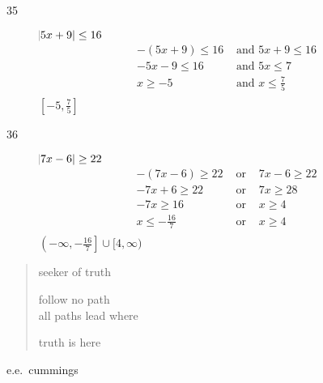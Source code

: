 \documentclass[letterpaper, landscape]{exam}
\begin{document}
\begin{description}
      \item[35]
        $ \abs{ 5x + 9 } \leq 16 $
        \begin{align*}
          -(5x + 9) \leq 16 & \text{ and } 5x + 9 \leq 16 \\
          -5x - 9 \leq 16   & \text{ and } 5x \leq 7 \\
          x \geq -5         & \text{ and } x \leq \frac{7}{5} \\
        \end{align*}
        $\boxed{ \left[ -5, \frac{7}{5} \right] }$

      \item[36]
        $\abs{ 7x - 6 } \geq 22$
        \begin{align*}
          -(7x - 6) \geq 22     & \text{ or } & 7x - 6 \geq 22 \\
          -7x + 6 \geq 22       & \text{ or } & 7x \geq 28 \\
          -7x \geq 16           & \text{ or } & x \geq 4 \\
          x \leq - \frac{16}{7} & \text{ or } & x \geq 4 \\
        \end{align*}
        $\boxed{ \left( -\infty, - \frac{16}{7} \right] \cup [4, \infty) }$

    \end{description}
  \fi

  \ifprintanswers{}
  \else
    \vspace{5 in}

    \begin{verse}
      seeker of truth

      follow no path \\
      all paths lead where

      truth is here 
    \end{verse}
    \hspace{1 in} e.e.\ cummings

  \fi
\end{document}
